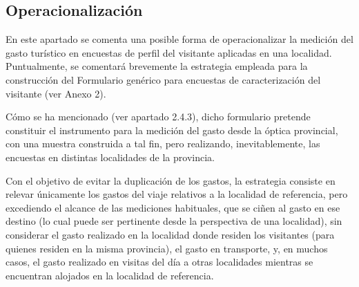 \documentclass[
]{book}
\begin{document}
\hypertarget{operacionalizaciuxf3n}{%
\subsection{Operacionalización}\label{operacionalizaciuxf3n}}

En este apartado se comenta una posible forma de operacionalizar la medición del gasto turístico en encuestas de perfil del visitante aplicadas en una localidad. Puntualmente, se comentará brevemente la estrategia empleada para la construcción del Formulario genérico para encuestas de caracterización del visitante (ver Anexo 2).

Cómo se ha mencionado (ver apartado 2.4.3), dicho formulario pretende constituir el instrumento para la medición del gasto desde la óptica provincial, con una muestra construida a tal fin, pero realizando, inevitablemente, las encuestas en distintas localidades de la provincia.

Con el objetivo de evitar la duplicación de los gastos, la estrategia consiste en relevar únicamente los gastos del viaje relativos a la localidad de referencia, pero excediendo el alcance de las mediciones habituales, que se ciñen al gasto en ese destino (lo cual puede ser pertinente desde la perspectiva de una localidad), sin considerar el gasto realizado en la localidad donde residen los visitantes (para quienes residen en la misma provincia), el gasto en transporte, y, en muchos casos, el gasto realizado en visitas del día a otras localidades mientras se encuentran alojados en la localidad de referencia.
\end{document}
